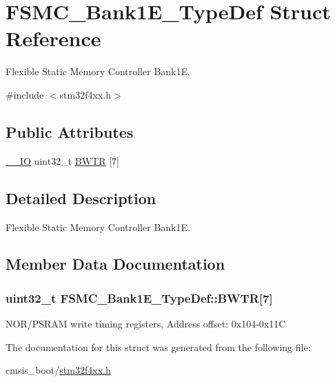 \hypertarget{struct_f_s_m_c___bank1_e___type_def}{}\section{F\+S\+M\+C\+\_\+\+Bank1\+E\+\_\+\+Type\+Def Struct Reference}
\label{struct_f_s_m_c___bank1_e___type_def}


Flexible Static Memory Controller Bank1E.  




{\ttfamily \#include $<$stm32f4xx.\+h$>$}

\subsection*{Public Attributes}
\begin{DoxyCompactItemize}
\item 
\hyperlink{core__cm4_8h_aec43007d9998a0a0e01faede4133d6be}{\+\_\+\+\_\+\+IO} uint32\+\_\+t \hyperlink{struct_f_s_m_c___bank1_e___type_def_afe650877ca972faff9c61fcb364c7b66}{B\+W\+TR} \mbox{[}7\mbox{]}
\end{DoxyCompactItemize}


\subsection{Detailed Description}
Flexible Static Memory Controller Bank1E. 

\subsection{Member Data Documentation}
\subsubsection[{\texorpdfstring{B\+W\+TR}{BWTR}}]{ uint32\+\_\+t F\+S\+M\+C\+\_\+\+Bank1\+E\+\_\+\+Type\+Def\+::\+B\+W\+TR\mbox{[}7\mbox{]}}\hypertarget{struct_f_s_m_c___bank1_e___type_def_afe650877ca972faff9c61fcb364c7b66}{}\label{struct_f_s_m_c___bank1_e___type_def_afe650877ca972faff9c61fcb364c7b66}
N\+O\+R/\+P\+S\+R\+AM write timing registers, Address offset\+: 0x104-\/0x11C 

The documentation for this struct was generated from the following file\+:\begin{DoxyCompactItemize}
\item 
cmsis\+\_\+boot/\hyperlink{stm32f4xx_8h}{stm32f4xx.\+h}\end{DoxyCompactItemize}

